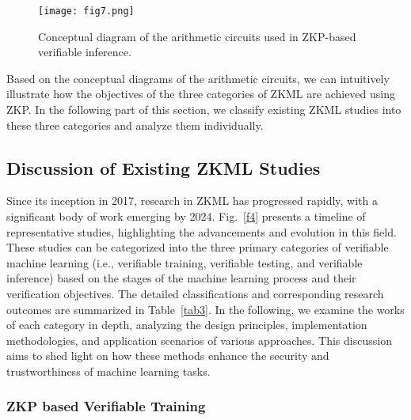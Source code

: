 \documentclass[journal]{IEEEtran}
\begin{document}
\begin{figure*}[t]
    \centering
    \texttt{[image: fig7.png]}
    \caption{Conceptual diagram of the arithmetic circuits used in ZKP-based verifiable inference.}
    \label{f7}
\end{figure*}





Based on the  conceptual diagrams of the arithmetic circuits, we can intuitively illustrate how the objectives of the three categories of ZKML are achieved using ZKP. In the following part of this section, we classify existing ZKML studies into these three categories and analyze them individually.











\subsection{Discussion of Existing ZKML Studies} \label{ss:3b}

Since its inception in 2017, research in ZKML has progressed rapidly, with a significant body of work emerging by 2024. Fig.~\ref{f4} presents a timeline of representative studies, highlighting the advancements and evolution in this field. These studies can be categorized into the three primary categories of verifiable machine learning (i.e., verifiable training, verifiable testing, and verifiable inference) based on the stages of the machine learning process and their verification objectives. The detailed classifications and corresponding research outcomes are summarized in Table~\ref{tab3}. In the following, we examine the works of each category in depth, analyzing the design principles, implementation methodologies, and application scenarios of various approaches. This discussion aims to shed light on how these methods enhance the security and trustworthiness of machine learning tasks. 









\subsubsection{\bf ZKP based Verifiable Training} \label{sss:3a}
\end{document}
